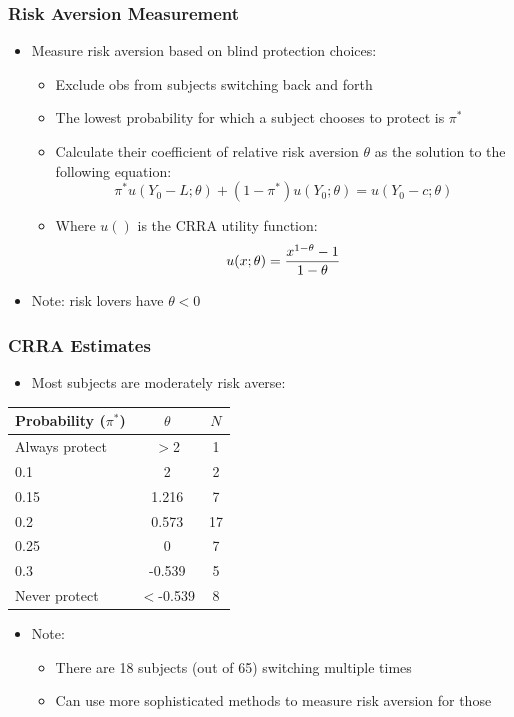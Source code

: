 \documentclass[11pt,hyperref={bookmarks=false}]{beamer}
\begin{document}
\fi


\begin{frame}
\frametitle{Risk Aversion Measurement}
\begin{itemize}
\item Measure risk aversion based on blind protection choices:
\begin{itemize}
\item Exclude obs from subjects switching back and forth
\item The lowest probability for which a subject chooses to protect is $\pi^*$
\item Calculate their coefficient of relative risk aversion $\theta$ as the solution to the following equation:
$$\pi^* u(Y_0-L;\theta)+(1-\pi^*)u(Y_0;\theta)=u(Y_0-c;\theta)$$
\item Where  $u()$ is the CRRA utility function:
$$u(x;\theta)={x^{1-\theta} -1 \over 1-\theta}$$
\end{itemize}
\item Note: risk lovers have $\theta<0$
\end{itemize}
\end{frame}


\begin{frame}
\frametitle{CRRA Estimates}
\begin{itemize}
\item Most subjects are moderately risk averse: 
\end{itemize}
\begin{table}[htbp]\centering

\begin{tabular}{l c c}
\hline\hline
Probability ($\pi^*$) &                $\theta$ & $N$\\
\hline
Always protect & $>$2 &   1 \\
0.1 & 2 & 2 \\
0.15 & 1.216 & 7 \\
0.2 & 0.573 & 17 \\
0.25 & 0 & 7 \\
0.3 & -0.539 & 5 \\
Never protect & $<$-0.539 &  8 \\
\hline
\end{tabular}
\end{table}
\begin{itemize}
\item Note: 
\begin{itemize}
\item There are 18 subjects (out of 65) switching multiple times
\item Can use more sophisticated methods to measure risk aversion for those
\end{itemize}
\end{itemize}
\end{frame}
\end{document}
